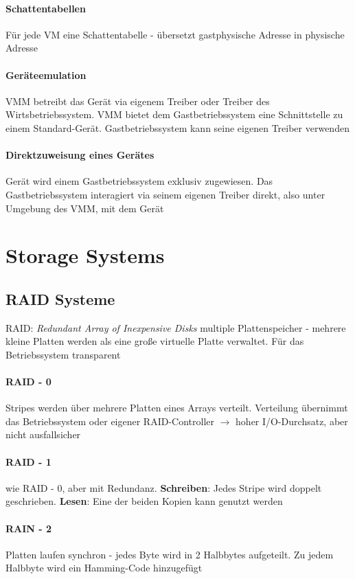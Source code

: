 \documentclass[10pt,a4paper,landscape]{article}
\begin{document}
\begin{multicols*}{3}
	\paragraph{Schattentabellen} Für jede VM eine Schattentabelle - übersetzt gastphysische Adresse in physische Adresse
	\paragraph{Geräteemulation} VMM betreibt das Gerät via eigenem Treiber oder Treiber des Wirtsbetriebssystem. VMM bietet dem Gastbetriebssystem eine Schnittstelle zu einem Standard-Gerät. Gastbetriebssystem kann seine eigenen Treiber verwenden
	\paragraph{Direktzuweisung eines Gerätes} Gerät wird einem Gastbetriebssystem exklusiv zugewiesen. Das Gastbetriebssystem interagiert via seinem eigenen Treiber direkt, also unter Umgebung des VMM, mit dem Gerät
	\section{Storage Systems}
	\subsection{RAID Systeme}
	RAID: \textit{Redundant Array of Inexpensive Disks} multiple Plattenspeicher - mehrere kleine Platten werden als eine große virtuelle Platte verwaltet. Für das Betriebssystem transparent
	\paragraph{RAID - 0} Stripes werden über mehrere Platten eines Arrays verteilt. Verteilung übernimmt das Betriebssystem oder eigener RAID-Controller $\rightarrow$ hoher I/O-Durchsatz, aber nicht ausfallsicher
	\paragraph{RAID - 1} wie RAID - 0, aber mit Redundanz. \textbf{Schreiben}: Jedes Stripe wird doppelt geschrieben. \textbf{Lesen}: Eine der beiden Kopien kann genutzt werden
	\paragraph{RAIN - 2} Platten laufen synchron - jedes Byte wird in 2 Halbbytes aufgeteilt. Zu jedem Halbbyte wird ein Hamming-Code hinzugefügt

\end{multicols*}
\end{document}
